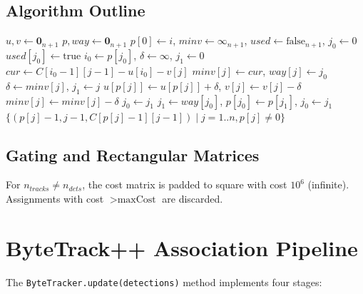 \subsection{Algorithm Outline}
\begin{algorithm}
\caption{Hungarian Algorithm (Square Cost Matrix)}
\begin{algorithmic}
\State $u, v \gets \mathbf{0}_{n+1}$ 
\State $p, way \gets \mathbf{0}_{n+1}$
    \State $p[0] \gets i$, $minv \gets \infty_{n+1}$, $used \gets \text{false}_{n+1}$, $j_0 \gets 0$
    \Repeat
        \State $used[j_0] \gets \text{true}$
        \State $i_0 \gets p[j_0]$, $\delta \gets \infty$, $j_1 \gets 0$
                \State $cur \gets C[i_0-1][j-1] - u[i_0] - v[j]$
                 $minv[j] \gets cur$, $way[j] \gets j_0$
                 $\delta \gets minv[j]$, $j_1 \gets j$
            \EndIf
        \EndFor
             $u[p[j]] \gets u[p[j]] + \delta$, $v[j] \gets v[j] - \delta$
            \Else $minv[j] \gets minv[j] - \delta$
        \EndFor
        \State $j_0 \gets j_1$
    \Repeat
        \State $j_1 \gets way[j_0]$, $p[j_0] \gets p[j_1]$, $j_0 \gets j_1$
\EndFor
\State \Return $\{(p[j]-1, j-1, C[p[j]-1][j-1]) \mid j=1..n, p[j] \neq 0\}$
\EndProcedure
\end{algorithmic}
\end{algorithm}

\subsection{Gating and Rectangular Matrices}
For $n_{tracks} \neq n_{dets}$, the cost matrix is padded to square with cost $10^6$ (infinite). Assignments with cost $> \text{maxCost}$ are discarded.

\section{ByteTrack++ Association Pipeline}
\label{sec:bytetrack-pipeline}

The \texttt{ByteTracker.update(detections)} method implements four stages:

